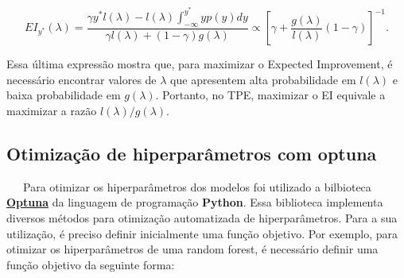 \documentclass[
  12pt,
  a4paper,
]{scrreprt}
\begin{document}
\[
EI_{y^*}\left(\lambda\right) = \frac{\gamma y^* l\left(\lambda\right) - l\left(\lambda\right) \int_{-\infty}^{y^*} yp\left(y\right)dy}{\gamma l\left(\lambda\right) + \left(1 - \gamma\right)g\left(\lambda\right)} \propto \left[\gamma + \frac{g\left(\lambda\right)}{l\left(\lambda\right)} \left(1 - \gamma\right)\right]^{-1}\text{.}
\]

Essa última expressão mostra que, para maximizar o Expected Improvement,
é necessário encontrar valores de \(\lambda\) que apresentem alta
probabilidade em \(l\left(\lambda\right)\) e baixa probabilidade em
\(g\left(\lambda\right)\). Portanto, no TPE, maximizar o EI equivale a
maximizar a razão \(l\left(\lambda\right) / g\left(\lambda\right)\).

\subsection{Otimização de hiperparâmetros com
optuna}\label{otimizauxe7uxe3o-de-hiperparuxe2metros-com-optuna}

~~~Para otimizar os hiperparâmetros dos modelos foi utilizado a
bilbioteca \href{https://optuna.org/}{\textbf{Optuna}} da linguagem de
programação \textbf{Python}. Essa biblioteca implementa diversos métodos
para otimização automatizada de hiperparâmetros. Para a sua utilização,
é preciso definir inicialmente uma função objetivo. Por exemplo, para
otimizar os hiperparâmetros de uma random forest, é necessário definir
uma função objetivo da seguinte forma:
\end{document}

